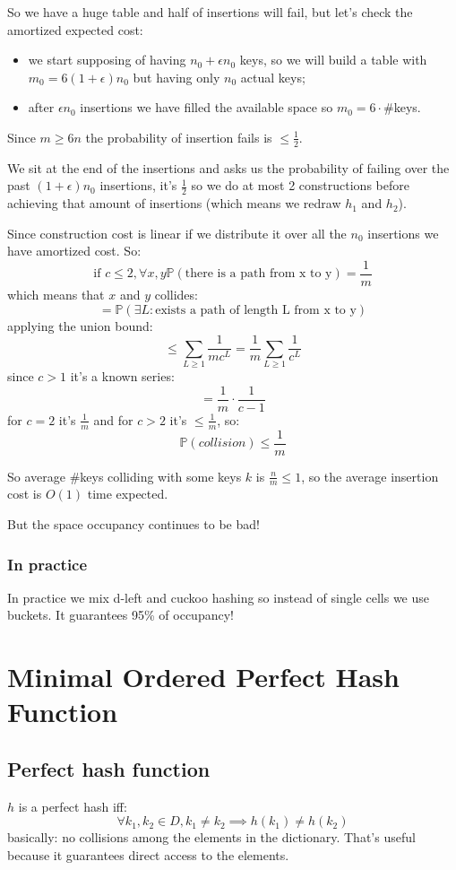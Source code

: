 So we have a huge table and half of insertions will fail, but let's check the amortized expected cost:
\begin{itemize}
    \item we start supposing of having $n_0 + \epsilon n_0$ keys, so we will build a table with $m_0 = 6(1 + \epsilon)n_0$ but having only $n_0$ actual keys;
    \item after $\epsilon n_0$ insertions we have filled the available space so $m_0 = 6 \cdot \#$keys.
\end{itemize}
Since $m \geq 6n$ the probability of insertion fails is $\leq \frac{1}{2}$.

We sit at the end of the insertions and asks us the probability of failing over the past $(1 + \epsilon)n_0$ insertions, it's $\frac{1}{2}$ so we do at most 2 constructions before achieving that amount of insertions (which means we redraw $h_1$ and $h_2$).

Since construction cost is linear if we distribute it over all the $n_0$ insertions we have amortized cost.
So:
$$
    \text{if } c \leq 2, \forall x, y \mathbb{P}(\text{there is a path from x to y}) = \frac{1}{m}
$$
which means that $x$ and $y$ collides:
$$
    = \mathbb{P}(\exists L : \text{exists a path of length L from x to y})
$$
applying the union bound:
$$
    \leq \sum_{L \geq 1} \frac{1}{mc^L} = \frac{1}{m} \sum_{L \geq 1} \frac{1}{c^L}
$$
since $c > 1$ it's a known series:
$$
    = \frac{1}{m} \cdot \frac{1}{c-1}
$$
for $c = 2$ it's $\frac{1}{m}$ and for $c > 2$ it's $\leq \frac{1}{m}$, so:
$$
    \mathbb{P}(collision) \leq \frac{1}{m}
$$

So average \#keys colliding with some keys $k$ is $\frac{n}{m} \leq 1$, so the average insertion cost is $O(1)$ time expected.

But the space occupancy continues to be bad!
\subsubsection{In practice}
In practice we mix d-left and cuckoo hashing so instead of single cells we use buckets.
It guarantees 95\% of occupancy!

\section{Minimal Ordered Perfect Hash Function}
\subsection{Perfect hash function}
$h$ is a perfect hash iff:
$$
    \forall k_1, k_2 \in D, k_1 \neq k_2 \implies h(k_1) \neq h(k_2)
$$
basically: no collisions among the elements in the dictionary.
That's useful because it guarantees direct access to the elements.

